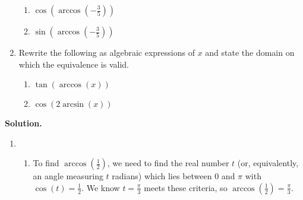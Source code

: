 \documentclass[12pt]{ximera}
\begin{document}
\begin{example}
\begin{enumerate}
\begin{multicols}{2}
\begin{enumerate}
\setcounter{HW}{\value{enumii}}

\end{enumerate}

\end{multicols}

\begin{multicols}{2}

\begin{enumerate}

\setcounter{enumii}{\value{HW}}

\item  $\cos\left(\arccos\left(-\frac{3}{5}\right)\right)$
\item  $\sin\left(\arccos\left(-\frac{3}{5}\right)\right)$

\end{enumerate}

\end{multicols}

\item  \label{algarcsincos} Rewrite the following as algebraic expressions of $x$ and state the domain on which the equivalence is valid.

\begin{multicols}{2}

\begin{enumerate}

\item \label{tanarccos} $\tan\left(\arccos\left(x \right)\right)$

\item  \label{cosarcsin} $\cos\left(2 \arcsin(x)\right)$

\end{enumerate}

\end{multicols}

\end{enumerate}

{\bf Solution.}

\begin{enumerate}

\item 

\begin{enumerate}

\item  To find $\arccos\left(\frac{1}{2}\right)$, we need to find the real number $t$ (or, equivalently, an angle measuring $t$ radians) which lies between $0$ and $\pi$ with $\cos(t) = \frac{1}{2}$. We know $t = \frac{\pi}{3}$ meets these criteria, so $\arccos\left(\frac{1}{2}\right)= \frac{\pi}{3}$.


\end{enumerate}
\end{enumerate}
\end{example}
\end{document}
